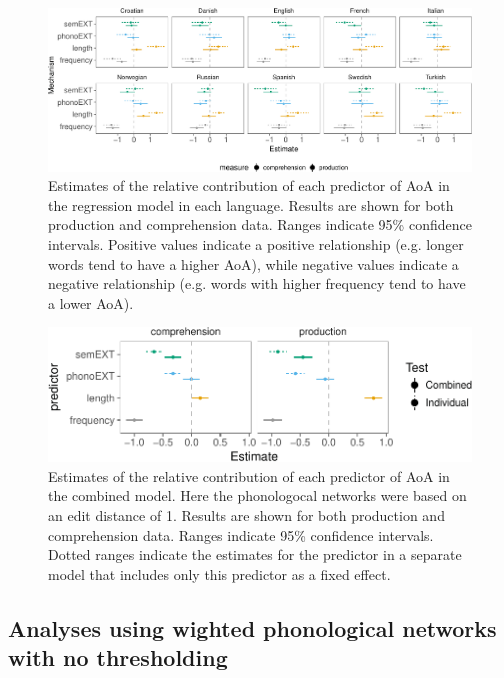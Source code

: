 \documentclass[english,floatsintext,man]{apa6}
\theoremstyle{definition}
\theoremstyle{definition}
\theoremstyle{definition}
\theoremstyle{remark}
\begin{document}
\begin{figure}[!h]
\includegraphics[width=\textwidth]{ms_files/figure-latex/staticPredEdit1-1} \caption{Estimates of the relative contribution of each predictor of AoA in the regression model in each language. Results are shown for both production and comprehension data. Ranges indicate 95\% confidence intervals. Positive values indicate a positive relationship (e.g. longer words tend to have a higher AoA), while negative values indicate a negative relationship (e.g. words with higher frequency tend to have a lower AoA).}\label{fig:staticPredEdit1}
\end{figure}

\begin{figure}[!h]
\includegraphics[width=\textwidth]{ms_files/figure-latex/staticAllEdit-1} \caption{Estimates of the relative contribution of each predictor of AoA in the combined model. Here the phonologocal networks were based on an edit distance of 1. Results are shown for both production and comprehension data. Ranges indicate 95\% confidence intervals. Dotted ranges indicate the estimates for the predictor in a separate model that includes only this predictor as a fixed effect.}\label{fig:staticAllEdit}
\end{figure}

\subsection{Analyses using wighted phonological networks with no
thresholding}\label{analyses-using-wighted-phonological-networks-with-no-thresholding}
\end{document}
